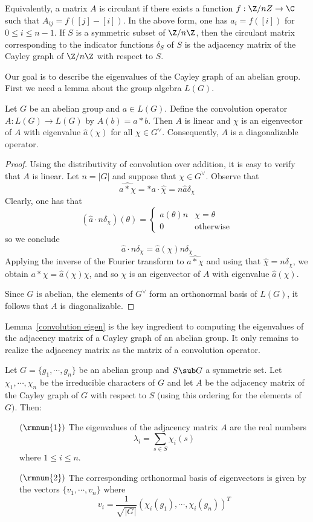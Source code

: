 Equivalently, a matrix $A$ is circulant if there exists a function $f:\Z/n
Z\to\C$ such that $A_{ij}=f([j]-[i])$. In the above form, one has $a_i=f([i])$ for $0\leq i\leq n-1$. If $S$ is a symmetric subset of $\Z/n\Z$, then the circulant matrix corresponding to the indicator functions $\delta_S$ of $S$ is the adjacency matrix of the Cayley graph of $\Z/n\Z$ with respect to $S$.\par
Our goal is to describe the eigenvalues of the Cayley graph of an abelian group. First we need a lemma about the group algebra $L(G)$.
\begin{lemma}\label{convolution eigen}
Let $G$ be an abelian group and $a\in L(G)$. Define the convolution operator $A:L(G)\to L(G)$ by $A(b)=a\ast b$. Then $A$ is linear and $\chi$ is an eigenvector of $A$ with eigenvalue $\widehat{a}(\chi)$ for all $\chi\in G^\vee$. Consequently, $A$ is a diagonalizable operator.
\end{lemma}
\begin{proof}
Using the distributivity of convolution over addition, it is easy to verify that $A$ is linear. Let $n=|G|$ and suppose that $\chi\in G^\vee$. Observe that
\[\widehat{a\ast\chi}=\ast{a}\cdot\widehat{\chi}=n\widehat{a}\delta_\chi\]
Clearly, one has that
\[(\widehat{a}\cdot n\delta_\chi)(\theta)=\begin{cases}
\widehat{a}(\theta)n&\chi=\theta\\
0&\text{otherwise}
\end{cases}\]
so we conclude
\[\widehat{a}\cdot n\delta_\chi=\widehat{a}(\chi)n\delta_\chi\]
Applying the inverse of the Fourier transform
to $\widehat{a\ast\chi}$ and using that $\widehat{\chi}=n\delta_\chi$, we obtain $a\ast\chi=\widehat{a}(\chi)\chi$, and so $\chi$ is an eigenvector of $A$ with eigenvalue $\widehat{a}(\chi)$.\par
Since $G$ is abelian, the elements of $G^\vee$ form an orthonormal basis of $L(G)$, it follows that $A$ is diagonalizable.
\end{proof}
Lemma~\ref{convolution eigen} is the key ingredient to computing the eigenvalues of the adjacency matrix of a Cayley graph of an abelian group. It only remains to realize the adjacency matrix as the matrix of a convolution operator.
\begin{theorem}
Let $G=\{g_1,\cdots,g_n\}$ be an abelian group and $S\sub G$ a symmetric set. Let $\chi_1,\cdots,\chi_n$ be the irreducible characters of $G$ and let $A$ be the adjacency matrix of the Cayley graph of $G$ with respect to $S$ $($using this ordering for the elements of $G)$. Then:
\begin{itemize}
\item[$(\rmnum{1})$]The eigenvalues of the adjacency matrix $A$ are the real numbers
\[\lambda_i=\sum_{s\in S}\chi_i(s)\]
where $1\leq i\leq n$.
\item[$(\rmnum{2})$]The corresponding orthonormal basis of eigenvectors is given by the vectors $\{v_1,\cdots,v_n\}$ where
\[v_i=\frac{1}{\sqrt{|G|}}(\chi_i(g_1),\cdots,\chi_i(g_n))^T\]
\end{itemize}
\end{theorem}
